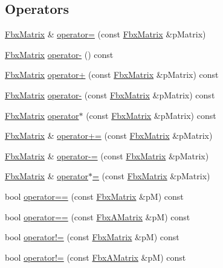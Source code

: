 \subsection*{Operators}
\begin{DoxyCompactItemize}
\item 
\hyperlink{class_fbx_matrix}{Fbx\+Matrix} \& \hyperlink{class_fbx_matrix_a45fad935c08ef083dddd3adddc3d6884}{operator=} (const \hyperlink{class_fbx_matrix}{Fbx\+Matrix} \&p\+Matrix)
\item 
\hyperlink{class_fbx_matrix}{Fbx\+Matrix} \hyperlink{class_fbx_matrix_a598bafa12879f9f233d8b5524ebdaad2}{operator-\/} () const
\item 
\hyperlink{class_fbx_matrix}{Fbx\+Matrix} \hyperlink{class_fbx_matrix_a34275146ae0b453898798760fe340650}{operator+} (const \hyperlink{class_fbx_matrix}{Fbx\+Matrix} \&p\+Matrix) const
\item 
\hyperlink{class_fbx_matrix}{Fbx\+Matrix} \hyperlink{class_fbx_matrix_a5a8209e3a84baf3961be72e9e7fa5c69}{operator-\/} (const \hyperlink{class_fbx_matrix}{Fbx\+Matrix} \&p\+Matrix) const
\item 
\hyperlink{class_fbx_matrix}{Fbx\+Matrix} \hyperlink{class_fbx_matrix_ae0fa68fdfa8db6ba53ec5a57ae6fc7d4}{operator$\ast$} (const \hyperlink{class_fbx_matrix}{Fbx\+Matrix} \&p\+Matrix) const
\item 
\hyperlink{class_fbx_matrix}{Fbx\+Matrix} \& \hyperlink{class_fbx_matrix_a9a4f35c24f2907b4d170bbd361d69fa6}{operator+=} (const \hyperlink{class_fbx_matrix}{Fbx\+Matrix} \&p\+Matrix)
\item 
\hyperlink{class_fbx_matrix}{Fbx\+Matrix} \& \hyperlink{class_fbx_matrix_a915b0943d6c81166423360bdd913d1d3}{operator-\/=} (const \hyperlink{class_fbx_matrix}{Fbx\+Matrix} \&p\+Matrix)
\item 
\hyperlink{class_fbx_matrix}{Fbx\+Matrix} \& \hyperlink{class_fbx_matrix_a1ef7240d9cedabb803a3701a0002ad33}{operator$\ast$=} (const \hyperlink{class_fbx_matrix}{Fbx\+Matrix} \&p\+Matrix)
\item 
bool \hyperlink{class_fbx_matrix_af6bccfe44b18342ed8dd8c9240ff1485}{operator==} (const \hyperlink{class_fbx_matrix}{Fbx\+Matrix} \&pM) const
\item 
bool \hyperlink{class_fbx_matrix_afe922424fb80e6508ece592785719ebc}{operator==} (const \hyperlink{class_fbx_a_matrix}{Fbx\+A\+Matrix} \&pM) const
\item 
bool \hyperlink{class_fbx_matrix_af6010241ffcf7a98b0b3df64602cae41}{operator!=} (const \hyperlink{class_fbx_matrix}{Fbx\+Matrix} \&pM) const
\item 
bool \hyperlink{class_fbx_matrix_a970735bf1972ec0d7bca51fd9bea48e7}{operator!=} (const \hyperlink{class_fbx_a_matrix}{Fbx\+A\+Matrix} \&pM) const
\end{DoxyCompactItemize}
